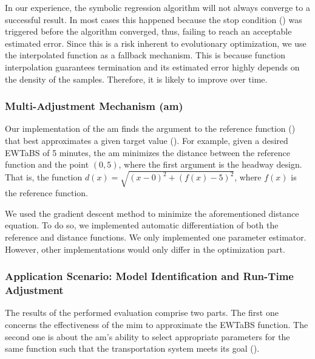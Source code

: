 In our experience, the symbolic regression algorithm will not always converge to a successful result. In most cases this happened because the stop condition () was triggered before the algorithm converged, thus, failing to reach an acceptable estimated error. Since this is a risk inherent to evolutionary optimization, we use the interpolated function as a fallback mechanism. This is because function interpolation guarantees termination and its estimated error highly depends on the density of the samples. Therefore, it is likely to improve over time.



\subsubsection{Multi-Adjustment Mechanism (\acrshort{am})}
\label{subsubsect:evaluation--suts-adjustment-mechanism}

Our implementation of the \gls{am} finds the argument to the reference function () that best approximates a given target value (). For example, given a desired \gls{EWTaBS} of 5 minutes, the \gls{am} minimizes the distance between the reference function and the point $(0, 5)$, where the first argument is the headway design. That is, the function $d(x)=\sqrt{(x-0)^2+(f(x)-5)^2}$, where $f(x)$ is the reference function.

We used the gradient descent method to minimize the aforementioned distance equation. To do so, we implemented automatic differentiation of both the reference and distance functions. We only implemented one parameter estimator. However, other implementations would only differ in the optimization part.


\subsubsection{Application Scenario: Model Identification and Run-Time Adjustment}
\label{subsubsect:evaluation--suts-application-scenario}

The results of the performed evaluation comprise two parts. The first one concerns the effectiveness of the \gls{mim} to approximate the \gls{EWTaBS} function. The second one is about the \gls{am}'s ability to select appropriate parameters for the same function such that the transportation system meets its goal ().

